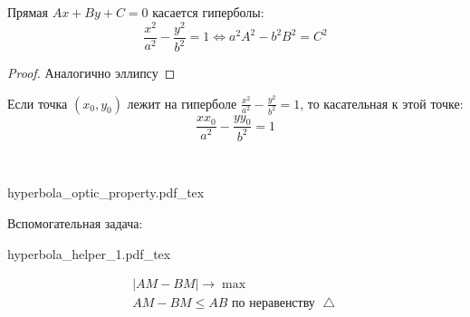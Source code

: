\documentclass[main]{subfiles}
\begin{document}
\begin{theorem}
    Прямая $Ax + By + C = 0$ касается гиперболы:
    \[\frac{x^2}{a^2} - \frac{y^2}{b^2}=1 \Leftrightarrow a^2A^2-b^2B^2=C^2\]
\end{theorem}
\begin{proof}
    Аналогично эллипсу
\end{proof}
\begin{theorem}
    Если точка $(x_0, y_0)$ лежит на гиперболе $\frac{x^2}{a^2} - \frac{y^2}{b^2}=1$,
    то касательная к этой точке:
    \[\frac{x x_0}{a^2} - \frac{y y_0}{b^2}=1\]
\end{theorem}
\begin{theorem}
    \

    \begin{center}
        {hyperbola_optic_property.pdf_tex}
    \end{center}
\end{theorem}

Вспомогательная задача:


\begin{minipage}{0.45\textwidth}
    {hyperbola_helper_1.pdf_tex}
\end{minipage}
\begin{minipage}{0.45\textwidth}
    \begin{gather*}
        |AM-BM|\to \max\\
        AM-BM \le AB \text{ по неравенству }\bigtriangleup
    \end{gather*}
\end{minipage}
\end{document}

